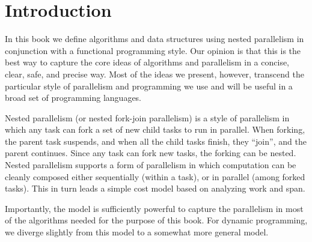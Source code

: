 \chapter{Introduction}
\label{ch:language:introduction}

\begin{cluster}
\label{grp:grm:language:introduction::book}

\begin{gram}
\label{grm:language:introduction::book}
  In this book we define algorithms and data structures using nested
  parallelism in conjunction with a functional programming style.  Our
  opinion is that this is the best way to capture the core ideas of
  algorithms and parallelism in a concise, clear, safe, and precise way.
  Most of the ideas we present, however, transcend the particular
  style of parallelism and programming we use and will be useful in a
  broad set of programming languages.

\end{gram}
\end{cluster}

\begin{cluster}
\label{grp:grm:language:introduction::nested-parallelism}

\begin{gram}
\label{grm:language:introduction::nested-parallelism}
  Nested parallelism (or nested fork-join parallelism) is a style of
  parallelism in which any task can fork a set of new child tasks to
  run in parallel.  When forking, the parent task suspends, and when
  all the child tasks finish, they ``join'', and the parent continues.
  Since any task can fork new tasks, the forking can be nested.
  Nested parallelism supports a form of parallelism in which
  computation can be cleanly composed either sequentially (within a
  task), or in parallel (among forked tasks).  This in turn leads a
  simple cost model based on analyzing work and span.

  Importantly, the model is sufficiently powerful to capture the
  parallelism in most of the algorithms needed for the purpose of this
  book.  For dynamic programming, we diverge slightly from this model
  to a somewhat more general model.

\end{gram}
\end{cluster}

